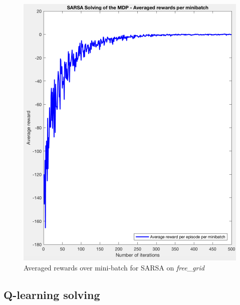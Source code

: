 \documentclass[a4paper]{report}
\begin{document}
{{{\begin{figure}[ht!]
\begin{minipage}{0.4\linewidth}
						\includegraphics[width=0.9\linewidth]{sarsa_average_rewards_freegrid}
						\caption{Averaged rewards over mini-batch for SARSA on \emph{free\_grid}}
					\end{minipage}
				\end{figure}
				  
			}
			\subsection{Q-learning solving}
			{
			
}}}
\end{document}

